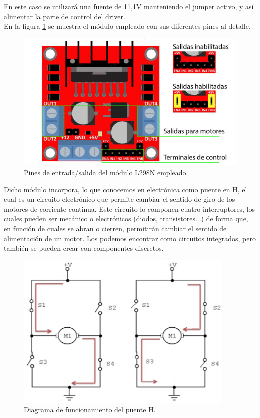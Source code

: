 En  este  caso  se  utilizará una fuente de 11,1V manteniendo el jumper activo, y así alimentar la parte de control del driver.\\

En la figura \ref{diagrama:L298N-salidas} se muestra el módulo empleado con sus diferentes pines al detalle.\\

\begin{figure}[H]
  \begin{center}
    \includegraphics[scale=2]{imagenes/L298N-conexiones.jpg}
  \end{center}
  \caption{Pines de entrada/salida del módulo L298N empleado.}
  \label{diagrama:L298N-salidas}
\end{figure}

Dicho módulo incorpora, lo que conocemos en electrónica como puente en H, el cual es un circuito electrónico que permite cambiar el sentido de giro de los 
motores de corriente continua. Este circuito lo componen cuatro interruptores, los cuales pueden ser mecánico o electrónicos (diodos, transistores...) de forma que,
en función de cuales se abran o cierren, permitirán cambiar el sentido de alimentación de un motor.  Los podemos encontrar como circuitos integrados, pero también se
pueden crear con componentes discretos.\\

\begin{figure}[H]
  \begin{center}
    \includegraphics[scale=0.7]{imagenes/esquema_puente_h.png}
  \end{center}
  \caption{Diagrama de funcionamiento del puente H.}
  \label{esquema:funcionamiento_puente_h}
\end{figure}

